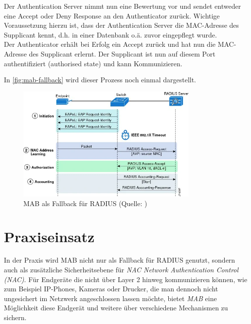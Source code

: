 \documentclass[conference]{IEEEtran}
\begin{document}
Der Authentication Server nimmt nun eine Bewertung vor und sendet entweder eine Accept oder Deny Response an den Authenticator zurück. Wichtige Voraussetzung hierzu ist, dass der Authentication Server die MAC-Adresse des Supplicant kennt, d.h. in einer Datenbank o.ä. zuvor eingepflegt wurde.\\

Der Authenticator erhält bei Erfolg ein Accept zurück und hat nun die MAC-Adresse des Supplicant erlernt. Der Supplicant ist nun auf diesem Port authentifiziert (authorised state) und kann Kommunizieren.

In \autoref{fig:mab-fallback} wird dieser Prozess noch einmal dargestellt.\\

\begin{figure}[hbt]
	\centering
	\includegraphics[width=9cm]{figures/mab-fallback}
	\caption{MAB als Fallback für RADIUS (Quelle: \cite{mab-deployment-guide})}
	\label{fig:mab-fallback}
\end{figure}

%

\section{Praxiseinsatz}
In der Praxis wird MAB nicht nur als Fallback für RADIUS genutzt, sondern auch als zusätzliche Sicherheitsebene für \emph{NAC Network Authentication Control (NAC)}. Für Endgeräte die nicht über Layer 2 hinweg kommunizieren können, wie zum Beispiel IP-Phones, Kameras oder Drucker, die man dennoch nicht ungesichert im Netzwerk angeschlossen lassen möchte, bietet \emph{MAB} eine Möglichkeit diese Endgerät und weitere über verschiedene Mechanismen zu sichern.
\end{document}
